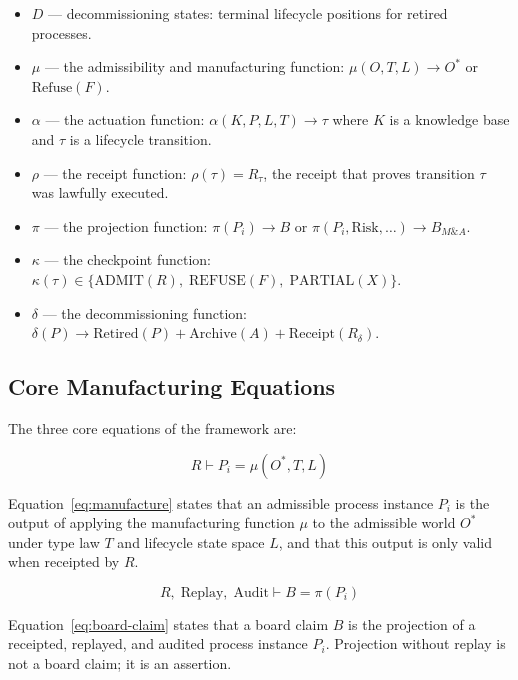 \begin{definition}
\begin{itemize}
    board-level representations.
  \item $D$ --- decommissioning states: terminal lifecycle positions for
    retired processes.
  \item $\mu$ --- the admissibility and manufacturing function:
    $\mu(O, T, L) \to O^*$ or $\mathrm{Refuse}(F)$.
  \item $\alpha$ --- the actuation function:
    $\alpha(K, P, L, T) \to \tau$ where $K$ is a knowledge base and $\tau$ is
    a lifecycle transition.
  \item $\rho$ --- the receipt function: $\rho(\tau) = R_\tau$, the receipt
    that proves transition $\tau$ was lawfully executed.
  \item $\pi$ --- the projection function:
    $\pi(P_i) \to B$ or $\pi(P_i, \mathrm{Risk}, \ldots) \to B_{M\&A}$.
  \item $\kappa$ --- the checkpoint function:
    $\kappa(\tau) \in \{\mathrm{ADMIT}(R),\; \mathrm{REFUSE}(F),\;
    \mathrm{PARTIAL}(X)\}$.
  \item $\delta$ --- the decommissioning function:
    $\delta(P) \to \mathrm{Retired}(P) + \mathrm{Archive}(A) +
    \mathrm{Receipt}(R_\delta)$.
\end{itemize}
\end{definition}

\subsection{Core Manufacturing Equations}

The three core equations of the framework are:

\begin{equation}
\label{eq:manufacture}
  R \vdash P_i = \mu(O^*, T, L)
\end{equation}

Equation~\eqref{eq:manufacture} states that an admissible process instance
$P_i$ is the output of applying the manufacturing function $\mu$ to the
admissible world $O^*$ under type law $T$ and lifecycle state space $L$, and
that this output is only valid when receipted by $R$.

\begin{equation}
\label{eq:board-claim}
  R,\; \mathrm{Replay},\; \mathrm{Audit} \vdash B = \pi(P_i)
\end{equation}

Equation~\eqref{eq:board-claim} states that a board claim $B$ is the
projection of a receipted, replayed, and audited process instance $P_i$.
Projection without replay is not a board claim; it is an assertion.

